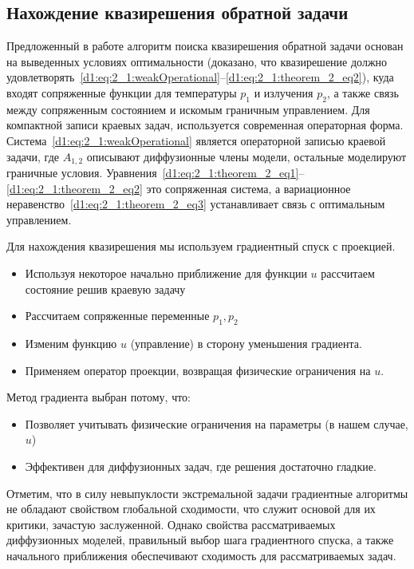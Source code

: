 \documentclass[8pt,a4paper]{article}
\begin{document}
    \subsection*{Нахождение квазирешения обратной задачи}
    Предложенный в работе алгоритм поиска квазирешения обратной задачи основан
    на выведенных условиях оптимальности
    (доказано, что квазирешение должно
    удовлетворять~\eqref{d1:eq:2_1:weakOperational}--\eqref{d1:eq:2_1:theorem_2_eq2}),
    куда входят сопряженные функции для температуры $p_1$ и излучения $p_2$,
    а также связь между сопряженным состоянием и искомым граничным управлением.
    Для компактной записи краевых задач, используется современная операторная форма.
    Система~\eqref{d1:eq:2_1:weakOperational} является операторной записью краевой задачи,
    где $A_{1,2}$ описывают диффузионные члены модели, остальные моделируют граничные условия.
    Уравнения~\eqref{d1:eq:2_1:theorem_2_eq1}--\eqref{d1:eq:2_1:theorem_2_eq2}
    это сопряженная система,
    а вариационное неравенство~\eqref{d1:eq:2_1:theorem_2_eq3}
    устанавливает связь с оптимальным управлением.

    Для нахождения квазирешения мы используем градиентный спуск с проекцией.
    \begin{itemize}
        \item Используя некоторое начально приближение для функции $u$ рассчитаем состояние решив краевую задачу
        \item Рассчитаем сопряженные переменные $p_1, p_2$
        \item Изменим функцию $u$ (управление) в сторону уменьшения градиента.
        \item Применяем оператор проекции, возвращая физические ограничения на $u$.
    \end{itemize}

    Метод градиента выбран потому, что:
    \begin{itemize}
        \item Позволяет учитывать физические ограничения на параметры (в нашем случае, $u$)
        \item Эффективен для диффузионных задач, где решения достаточно гладкие.
    \end{itemize}


    Отметим, что в силу невыпуклости экстремальной задачи градиентные алгоритмы не обладают
    свойством глобальной сходимости, что служит основой для их критики, зачастую заслуженной.
    Однако свойства рассматриваемых диффузионных моделей,
    правильный выбор шага градиентного спуска, а также начального приближения
    обеспечивают сходимость для рассматриваемых задач.
\end{document}
